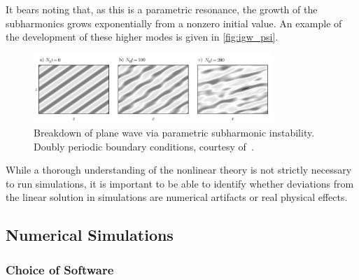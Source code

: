 \documentclass[11pt,
        usenames, %
        dvipsnames %
    ]{article}
\begin{document}
\begin{description}
        It bears noting that, as this is a parametric resonance, the growth of
        the subharmonics grows exponentially from a nonzero initial value. An
        example of the development of these higher modes is given in
        \autoref{fig:igw_psi}.
        \begin{figure}[t]
            \centering
            \includegraphics[width=0.8\textwidth]{figs/igw_psi.png}
            \caption{Breakdown of plane wave via parametric subharmonic
            instability. Doubly periodic boundary conditions, courtesy
            of~\cite{SutherlandBook}.}\label{fig:igw_psi}
        \end{figure}
\end{description}

While a thorough understanding of the nonlinear theory is not strictly
necessary to run simulations, it is important to be able to identify whether
deviations from the linear solution in simulations are numerical artifacts or
real physical effects.

\subsection{Numerical Simulations}

\subsubsection{Choice of Software}
\end{document}
